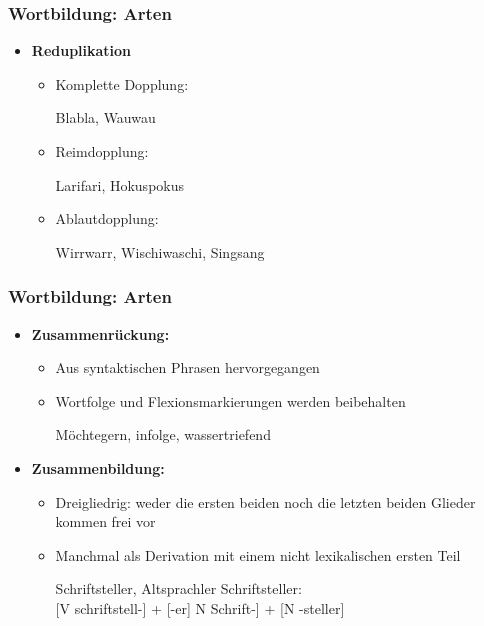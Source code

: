 \begin{frame}
\frametitle{Wortbildung: Arten}

\begin{itemize}
	\item \textbf{Reduplikation}

		\begin{itemize}
			\item Komplette Dopplung:
	
			\ea Blabla, Wauwau
			\z
	
			\item Reimdopplung:
	
			\ea Larifari, Hokuspokus
			\z
	
			\item Ablautdopplung:
	
			\ea Wirrwarr, Wischiwaschi, Singsang
			\z
	
		\end{itemize}

\end{itemize}

\end{frame}


\begin{frame}
\frametitle{Wortbildung: Arten}

\begin{itemize}
	\item \textbf{Zusammenrückung:}
	
	\begin{itemize}
		\item Aus syntaktischen Phrasen hervorgegangen
		\item Wortfolge und Flexionsmarkierungen werden beibehalten
		
		\ea Möchtegern, infolge, wassertriefend
		\z
		
	\end{itemize}
	
	\item \textbf{Zusammenbildung:}
	
	\begin{itemize}
		\item Dreigliedrig: weder die ersten beiden noch die letzten beiden Glieder kommen frei vor
		\item Manchmal als Derivation mit einem nicht lexikalischen ersten Teil
		
		\eal 
			\ex Schriftsteller, Altsprachler
			\ex Schriftsteller: \\ {[}V schriftstell-{]} + {[}-er{]} \vs {[}N Schrift-{]} + {[}N -steller{]}
		\zl
			 
	\end{itemize}
\end{itemize}


\end{frame}


